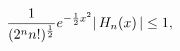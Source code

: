 \[\frac{1}{(2^{n}n!)^{\frac{1}{2}}}e^{-\frac{1}{2}x^{2}}|\mathop{H_{n}\/}%
\nolimits\!\left(x\right)|\leq 1,\]